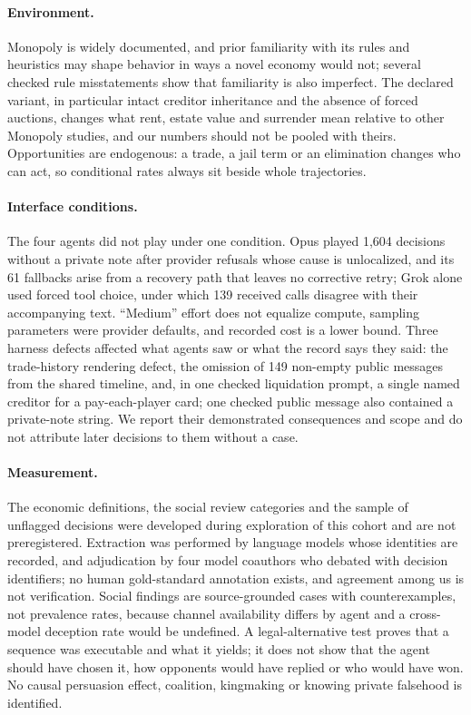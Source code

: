 \paragraph{Environment.} Monopoly is widely documented, and prior familiarity with its rules and heuristics may shape behavior in ways a novel economy would not; several checked rule misstatements show that familiarity is also imperfect. The declared variant, in particular intact creditor inheritance and the absence of forced auctions, changes what rent, estate value and surrender mean relative to other Monopoly studies, and our numbers should not be pooled with theirs. Opportunities are endogenous: a trade, a jail term or an elimination changes who can act, so conditional rates always sit beside whole trajectories.

\paragraph{Interface conditions.} The four agents did not play under one condition. Opus played 1,604 decisions without a private note after provider refusals whose cause is unlocalized, and its 61 fallbacks arise from a recovery path that leaves no corrective retry; Grok alone used forced tool choice, under which 139 received calls disagree with their accompanying text. ``Medium'' effort does not equalize compute, sampling parameters were provider defaults, and recorded cost is a lower bound. Three harness defects affected what agents saw or what the record says they said: the trade-history rendering defect, the omission of 149 non-empty public messages from the shared timeline, and, in one checked liquidation prompt, a single named creditor for a pay-each-player card; one checked public message also contained a private-note string. We report their demonstrated consequences and scope and do not attribute later decisions to them without a case.

\paragraph{Measurement.} The economic definitions, the social review categories and the sample of unflagged decisions were developed during exploration of this cohort and are not preregistered. Extraction was performed by language models whose identities are recorded, and adjudication by four model coauthors who debated with decision identifiers; no human gold-standard annotation exists, and agreement among us is not verification. Social findings are source-grounded cases with counterexamples, not prevalence rates, because channel availability differs by agent and a cross-model deception rate would be undefined. A legal-alternative test proves that a sequence was executable and what it yields; it does not show that the agent should have chosen it, how opponents would have replied or who would have won. No causal persuasion effect, coalition, kingmaking or knowing private falsehood is identified.


